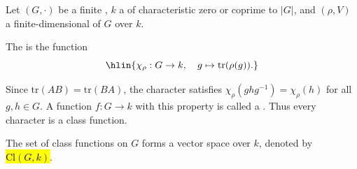 \begin{definition} \label{definition:character_of_a_finite_group_representation_over_a_field}

    Let $(G, \cdot)$ be a finite , $k$ a  of characteristic zero or coprime to $|G|$, and $(\rho, V)$ a finite-dimensional  of $G$ over $k$.

    The  is the function
    $$\hlin{\chi_\rho : G \to k, \quad g \mapsto \mathrm{tr}(\rho(g)).}$$

    Since $\mathrm{tr}(AB) = \mathrm{tr}(BA)$, the character satisfies $\chi_\rho(ghg^{-1}) = \chi_\rho(h)$ for all $g, h \in G$. A function $f : G \to k$ with this property is called a . Thus every character is a class function.

    The set of class functions on $G$ forms a vector space over $k$, denoted by \hl{$\mathrm{Cl}(G, k)$}.
\end{definition}
